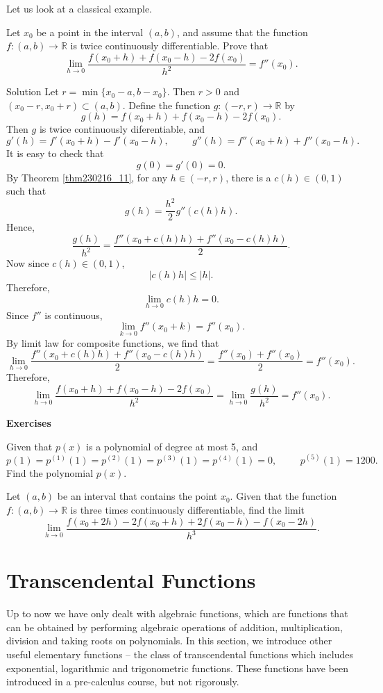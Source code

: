 Let us look at a  classical example.
\begin{example}[label=ex230216_17]{}
Let $x_0$ be a point in the interval $(a, b)$, and assume that the function $f:(a,b)\to \mathbb{R}$ is twice continuously differentiable. Prove that
\[\lim_{h\to 0}\frac{f(x_0+h)+f(x_0-h)-2f(x_0)}{h^2}=f''(x_0).\]
\end{example}
\begin{solution}{Solution}
Let $r=\min\{x_0-a, b-x_0\}$. Then $r>0$ and $(x_0-r,x_0+r)\subset (a, b)$. Define the function $g:(-r,r)\to \mathbb{R}$   by
\[g(h)=f(x_0+h)+f(x_0-h)-2f(x_0).\]
Then $g$ is twice continuously diferentiable, and
\[g'(h)=f'(x_0+h)-f'(x_0-h),\hspace{1cm} 
g''(h)=f''(x_0+h)+f''(x_0-h).\]
It is easy to check that
\[g(0)=g'(0)=0.\]By Theorem \ref{thm230216_11}, for any $h\in (-r,r)$, there is a $c(h)\in (0,1)$ such that
\[g(h)=\frac{h^2}{2}g''(c(h)h).\]
Hence,
\[\frac{g(h)}{h^2}=\frac{f''(x_0+c(h)h)+f''(x_0-c(h)h)}{2}.\]
Now since $c(h)\in (0,1)$,
\[|c(h)h|\leq |h|.\]
Therefore, 
\[\lim_{h\to 0}c(h)h=0.\]
Since $f''$ is continuous,
\[\lim_{k\to 0}f''(x_0+k)=f''(x_0).\]
By limit law for composite functions, we find that
\[\lim_{h\to 0}\frac{f''(x_0+c(h)h)+f''(x_0-c(h)h)}{2}=\frac{f''(x_0)+f''(x_0)}{2}=f''(x_0).\]
Therefore,
\[\lim_{h\to 0}\frac{f(x_0+h)+f(x_0-h)-2f(x_0)}{h^2}=\lim_{h\to 0}\frac{g(h)}{h^2}=f''(x_0).\]
\end{solution}
\vp
\noindent
{\bf \large Exercises  \thesection}
\setcounter{myquestion}{1}
\begin{question}{\themyquestion}
Given that $p(x)$ is a polynomial of degree at most 5, and
\[p(1)=p^{(1)}(1)=p^{(2)}(1)=p^{(3)}(1)=p^{(4)}(1)=0,\hspace{1cm}p^{(5)}(1)=1200.\]
Find the polynomial $p(x)$.
\end{question}

\atc
\begin{question}{\themyquestion}
Let $(a, b)$ be an interval that contains the point $x_0$. Given that the function $f:(a,b)\to\mathbb{R}$ is three times continuously differentiable, find the limit
\[\lim_{h\to 0}\frac{f(x_0+2h)-2f(x_0+h)+2f(x_0-h)- f(x_0-2h)}{h^3}.\]
\end{question}

\vp
\section{Transcendental Functions}\label{sec3.5}

Up to now we have only dealt with  algebraic functions, which are functions that can be obtained by performing algebraic operations of addition,  multiplication, division and taking roots on polynomials. 
In this section, we introduce other useful elementary functions -- the class of transcendental functions which  includes exponential, logarithmic and trigonometric functions.  These functions have been introduced in  a pre-calculus course, but not rigorously.  

